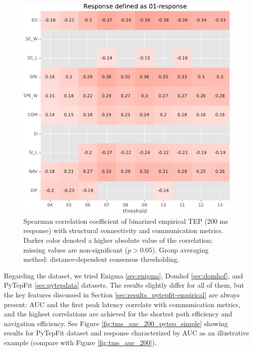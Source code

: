 \begin{figure}
    \centering
    \includegraphics[width=\textwidth]{images/nootebook_generated/pytepfit_results/empirical/200/not_over_threshold_nan/Mica-Mics_dist/Response defined as 01-response.pdf}
    \caption[Binarized TEP (200 ms) correlations (dist)]{Spearman correlation coefficient of binarized empirical TEP (200 ms response) with structural connectivity and communication metrics. Darker color denoted a higher absolute value of the correlation; missing values are non-significant ($p>0.05$). Group averaging method: distance-dependent consensus thresholding.}
    \label{fig:tms_01_200_dist}
\end{figure}

Regarding the dataset, we tried Enigma \ref{sec:enigma}, Domhof \ref{sec:domhof}, and PyTepFit \ref{sec:pytepdata} datasets. The results slightly differ for all of them, but the key features discussed in Section \ref{sec:results_pytepfit-empirical} are always present: AUC and the first peak latency correlate with communication metrics, and the highest correlations are achieved for the shortest path efficiency and navigation efficiency. See Figure \ref{fig:tms_auc_200_pytep_simple} showing results for PyTepFit dataset and response characterized by AUC as an illustrative example (compare with Figure \ref{fig:tms_auc_200}).

